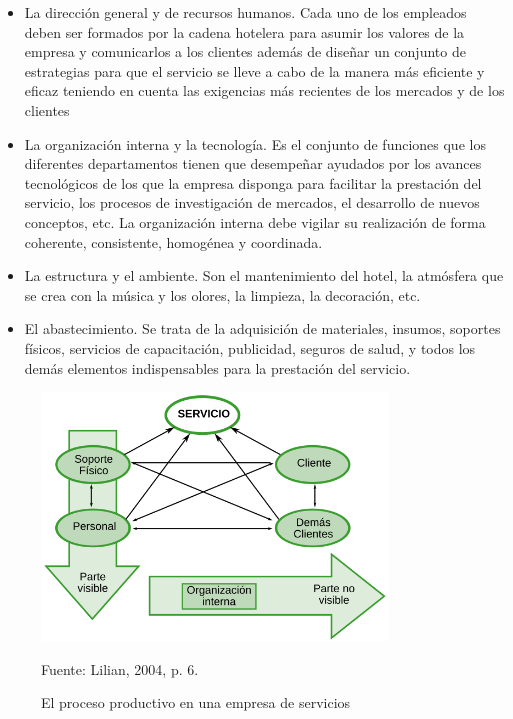 \begin{itemize} 
			\item La dirección general y de recursos humanos. Cada uno de los empleados deben ser formados por la cadena hotelera para asumir los valores de la empresa y comunicarlos a los clientes además de diseñar un conjunto de estrategias para que el servicio se lleve a cabo de la manera más eficiente y eficaz teniendo en cuenta las exigencias más recientes de los mercados y de los clientes 
			\item La organización interna y la tecnología. Es el conjunto de funciones que los diferentes departamentos tienen que desempeñar ayudados por los avances tecnológicos de los que la empresa disponga para facilitar la prestación del servicio, los procesos de investigación de mercados, el desarrollo de nuevos conceptos, etc. La organización interna debe vigilar su realización de forma coherente, consistente, homogénea y coordinada. 
			\item La estructura y el ambiente. Son el mantenimiento del hotel, la atmósfera que se crea con la música y los olores, la limpieza, la decoración, etc. 
			\item El abastecimiento. Se trata de la adquisición de materiales, insumos, soportes físicos, servicios de capacitación, publicidad, seguros de salud, y todos los demás elementos indispensables para la prestación del servicio. 
\end{itemize}

\begin{figure}[!h]
	\caption{El proceso productivo en una empresa de servicios}
	\centering \includegraphics[width=92mm]{capitulos/graficos/procesoProductivoServiciosEiglier} 
	\label{fig:procesoProductivoServiciosEiglier} 

	\footnotesize
		Fuente: Lilian, 2004, p. 6.
\end{figure}

